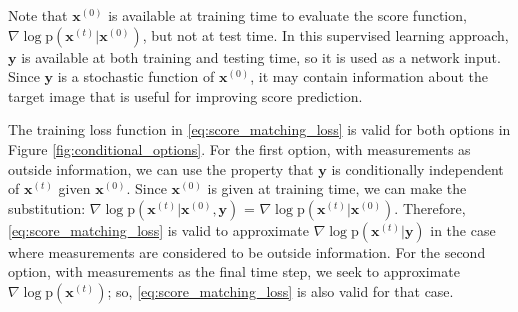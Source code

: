 \documentclass[12pt,]{article}
\begin{document}
Note that $\mathbf{x}^{(0)}$ is available at training time to evaluate the score function, $\nabla \log{\text{p} (\mathbf{x}^{(t)}|\mathbf{x}^{(0)})}$, but not at test time. In this supervised learning approach, $\mathbf{y}$ is available at both training and testing time, so it is used as a network input. Since $\mathbf{y}$ is a stochastic function of $\mathbf{x}^{(0)}$, it may contain information about the target image that is useful for improving score prediction.

The training loss function in \eqref{eq:score_matching_loss} is valid for both options in Figure \ref{fig:conditional_options}. For the first option, with measurements as outside information, we can use the property that  $\mathbf{y}$ is conditionally independent of $\mathbf{x}^{(t)}$ given $\mathbf{x}^{(0)}$. Since $\mathbf{x}^{(0)}$ is given at training time, we can make the substitution: $\nabla \log{\text{p} (\mathbf{x}^{(t)}|\mathbf{x}^{(0)}, \mathbf{y} )}$ = $\nabla \log{\text{p} (\mathbf{x}^{(t)}|\mathbf{x}^{(0)})}$. Therefore, \eqref{eq:score_matching_loss} is valid to approximate $\nabla \log \text{p}(\mathbf{x}^{(t)}| \mathbf{y})$ in the case where measurements are considered to be outside information. For the second option, with measurements as the final time step, we seek to approximate $\nabla \log \text{p}(\mathbf{x}^{(t)})$; so, \eqref{eq:score_matching_loss} is also valid for that case.






\end{document}
